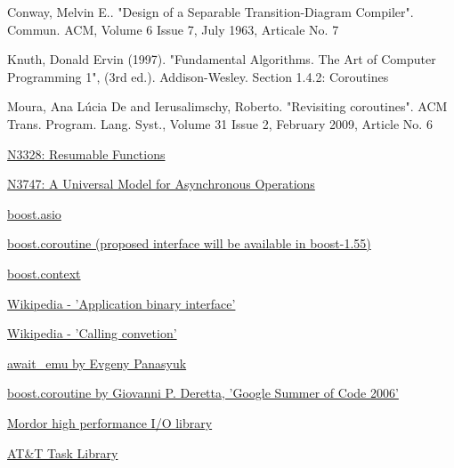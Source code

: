 \begin{thebibliography}{99}

        {Conway, Melvin E.. "Design of a Separable Transition-Diagram Compiler".
         Commun. ACM, Volume 6 Issue 7, July 1963, Articale No. 7}

        {Knuth, Donald Ervin (1997). "Fundamental Algorithms. The Art of Computer Programming 1", (3rd ed.).
         Addison-Wesley. Section 1.4.2: Coroutines}

        {Moura, Ana L\'{u}cia De and Ierusalimschy, Roberto. "Revisiting coroutines".
         ACM Trans. Program. Lang. Syst., Volume 31 Issue 2, February 2009, Article No. 6}

        \href{http://www.open-std.org/jtc1/sc22/wg21/docs/papers/2012/n3328.pdf}
        {N3328: Resumable Functions}

        \href{http://www.open-std.org/jtc1/sc22/wg21/docs/papers/2013/n3747.pdf}
        {N3747: A Universal Model for Asynchronous Operations}

        \href{http://www.boost.org/doc/libs/1_54_0/doc/html/boost_asio.html}
        {boost.asio}

        \href{http://www.boost.org}
        {boost.coroutine (proposed interface will be available in boost-1.55)}

        \href{http://www.boost.org}
        {boost.context}

        \href{http://en.wikipedia.org/wiki/Application_binary_interface}
        {Wikipedia - 'Application binary interface'}

        \href{http://en.wikipedia.org/wiki/Calling_convention}
        {Wikipedia - 'Calling convetion'}

        \href{http://github.com/panaseleus/await_emu}
        {await\_emu by Evgeny Panasyuk}

        \href{http://www.crystalclearsoftware.com/soc/coroutine/}
        {boost.coroutine by Giovanni P. Deretta, 'Google Summer of Code 2006'}

        \href{http://code.mozy.com/projects/mordor}
        {Mordor high performance I/O library}

        \href{http://www.softwarepreservation.org/projects/c_plus_plus/cfront/release_2.0/doc/LibraryManual.pdf}
        {AT\&T Task Library}


\end{thebibliography}
